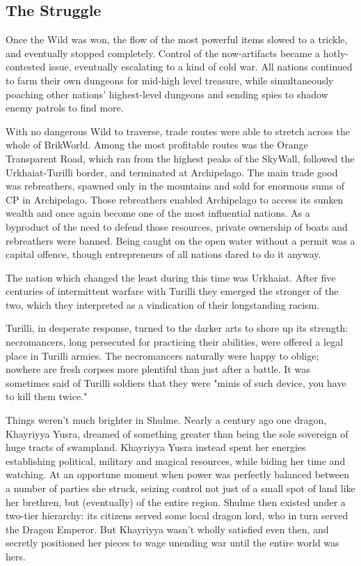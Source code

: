 \documentclass[12pt,a4paper,twocolumn]{article}
\begin{document}
\subsection{The Struggle}

Once the Wild was won, the flow of the most powerful items slowed to a trickle, and eventually stopped completely.  Control of the now-artifacts became a hotly-contested issue, eventually escalating to a kind of cold war.  All nations continued to farm their own dungeons for mid-high level treasure, while simultaneously poaching other nations' highest-level dungeons and sending spies to shadow enemy patrols to find more.  

With no dangerous Wild to traverse, trade routes were able to stretch across the whole of BrikWorld.  Among the most profitable routes was the Orange Transparent Road, which ran from the highest peaks of the SkyWall, followed the Urkhaiat-Turilli border, and  terminated at Archipelago.  The main trade good was rebreathers, spawned only in the mountains and sold for enormous sums of CP in Archipelago.  Those rebreathers enabled Archipelago to access its sunken wealth and once again become one of the most influential nations.  As a byproduct of the need to defend those resources, private ownership of boats and rebreathers were banned.  Being caught on the open water without a permit was a capital offence, though entrepreneurs of all nations dared to do it anyway.

The nation which changed the least during this time was Urkhaiat.  After five centuries of intermittent warfare with Turilli they emerged the stronger of the two, which they interpreted as a vindication of their longstanding racism.  

Turilli, in desperate response, turned to the darker arts to shore up its strength: necromancers, long persecuted for practicing their abilities, were offered a legal place in Turilli armies.  The necromancers naturally were happy to oblige; nowhere are fresh corpses more plentiful than just after a battle.  It was sometimes said of Turilli soldiers that they were "minis of such device, you have to kill them twice."

Things weren't much brighter in Shulme.  Nearly a century ago one dragon, Khayriyya Yusra, dreamed of something greater than being the sole sovereign of huge tracts of swampland. Khayriyya Yusra instead spent her energies establishing political, military and magical resources, while biding her time and watching.  At an opportune moment when power was perfectly balanced between a number of parties she struck, seizing control not just of a small spot of land like her brethren, but (eventually) of the entire region.  Shulme then existed under a two-tier hierarchy: its citizens served some local dragon lord, who in turn served the Dragon Emperor.  But Khayriyya wasn't wholly satisfied even then, and secretly positioned her pieces to wage unending war until the entire world was hers.
\end{document}
